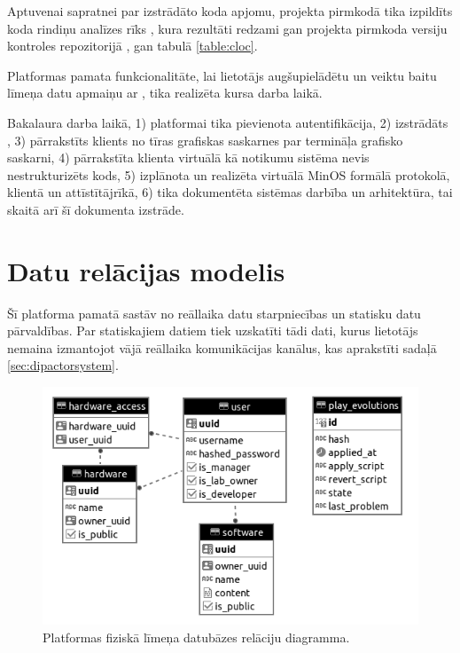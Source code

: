 Aptuvenai sapratnei par izstrādāto koda apjomu, projekta pirmkodā tika izpildīts
koda rindiņu analīzes rīks \cite{AlDanialCloc}, kura rezultāti redzami gan projekta
pirmkoda versiju kontroles repozitorijā \cite{VeinbahsKrisjanisTestbed}, gan tabulā
\ref{table:cloc}.

Platformas pamata funkcionalitāte, lai lietotājs augšupielādētu
 un veiktu baitu līmeņa datu apmaiņu ar
, tika realizēta kursa darba laikā.

Bakalaura darba laikā, 1) platformai tika pievienota autentifikācija, 2)
izstrādāts , 3) pārrakstīts klients no
tīras grafiskas saskarnes par termināļa grafisko saskarni, 4) pārrakstīta
klienta virtuālā  kā notikumu sistēma nevis
nestrukturizēts kods, 5) izplānota un realizēta virtuālā
 MinOS formālā protokolā, klientā un
attīstītājrīkā, 6) tika dokumentēta sistēmas darbība un arhitektūra, tai skaitā
arī šī dokumenta izstrāde.

\section{Datu relācijas modelis}
\label{sec:staticdata}

Šī platforma pamatā sastāv no reāllaika datu starpniecības un statisku datu
pārvaldības. Par statiskajiem datiem tiek uzskatīti tādi dati, kurus lietotājs
nemaina izmantojot vājā reāllaika komunikācijas kanālus, kas aprakstīti sadaļā
\ref{sec:dipactorsystem}. 

\begin{figure}[H]
    \includegraphics[width=0.7\linewidth]{assets/physical-er-diagram-gray.png}
    \centering
    \caption{Platformas fiziskā līmeņa datubāzes relāciju diagramma.}
    \label{fig:staticdata}
\end{figure}

